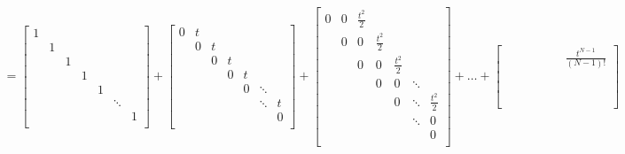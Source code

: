 \documentclass[letterpaper,10pt,english]{jupyterBook}
\begin{document}
\begin{equation*}
\begin{split}
    = \left[ {\begin{array}{ccccccc}
    1 &  &  &  &  &  & \\
     & 1 &  &  &  &  &\\
     &  & 1 &  &  &  &\\
     &  &  & 1 &  &  &\\
     &  &  &  & 1 &  &\\
     &  &  &  &  & \ddots &\\
     &  &  &  &  &  & 1 \\
\end{array} } \right] + \left[ {\begin{array}{ccccccc}
    0 & t &  &  &  &  & \\
     & 0 & t &  &  &  &\\
     &  & 0 & t &  &  &\\
     &  &  & 0 & t &  &\\
     &  &  &  & 0 & \ddots &  \\
     &  &  &  &  & \ddots & t \\
     &  &  &  &  &  & 0 \\
\end{array} } \right] + \left[ {\begin{array}{ccccccc}
    0 & 0 & \frac{t^2}{2} &  &  &  & \\
     & 0 & 0 & \frac{t^2}{2} &  &  &\\
     &  & 0 & 0 & \frac{t^2}{2} &  &\\
     &  &  & 0 & 0 & \ddots &\\
     &  &  &  & 0 & \ddots & \frac{t^2}{2} \\
     &  &  &  &  & \ddots & 0 \\
     &  &  &  &  &  & 0 \\
\end{array} } \right] + \dotsc + \left[ {\begin{array}{ccccccc}
     &  &  &  &  &  & \frac{t^{N-1}}{(N-1)!}\\
     &  &  &  &  &  &  \\
     &  &  &  &  &  &  \\
     &  &  &  &  &  &  \\
     &  &  &  &  &  &  \\
     &  &  &  &  &  &  \\
     &  &  &  &  &  &  \\
\end{array} } \right]

\end{split}
\end{equation*}
\end{document}
